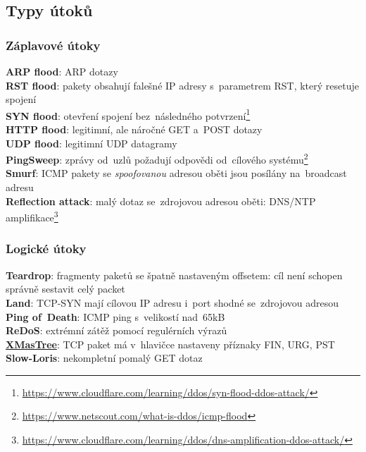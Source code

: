 \subsection{Typy útoků}

\subsubsection{Záplavové útoky}

\textbf{ARP flood}: ARP dotazy \\
\textbf{RST flood}: pakety obsahují falešné IP adresy s~parametrem RST, který resetuje spojení \\
\textbf{SYN flood}: otevření spojení bez~následného potvrzení\footnote{\url{https://www.cloudflare.com/learning/ddos/syn-flood-ddos-attack/}} \\
\textbf{HTTP flood}: legitimní, ale náročné GET a~POST dotazy \\
\textbf{UDP flood}: legitimní UDP datagramy \\
\textbf{PingSweep}: zprávy od~uzlů požadují odpovědi od~cílového systému\footnote{\url{https://www.netscout.com/what-is-ddos/icmp-flood}} \\
\textbf{Smurf}: ICMP pakety se \emph{spoofovanou} adresou oběti jsou posílány na~broadcast adresu \\
\textbf{Reflection attack}: malý dotaz se~zdrojovou adresou oběti: DNS/NTP amplifikace\footnote{\url{https://www.cloudflare.com/learning/ddos/dns-amplification-ddos-attack/}}
 

\subsubsection{Logické útoky}

\textbf{Teardrop}: fragmenty paketů se špatně nastaveným offsetem: cíl není schopen správně sestavit celý packet \\
\textbf{Land}: TCP-SYN mají cílovou IP adresu i~port shodné se~zdrojovou adresou \\
\textbf{Ping of~Death}: ICMP ping s~velikostí nad~65kB \\
\textbf{ReDoS}: extrémní zátěž pomocí regulérních výrazů \\
\href{https://www.youtube.com/watch?v=XiFkyR35v2Y}{\textbf{XMasTree}}: TCP paket má v~hlavičce nastaveny příznaky FIN, URG, PST \\
\textbf{Slow-Loris}: nekompletní pomalý GET dotaz

